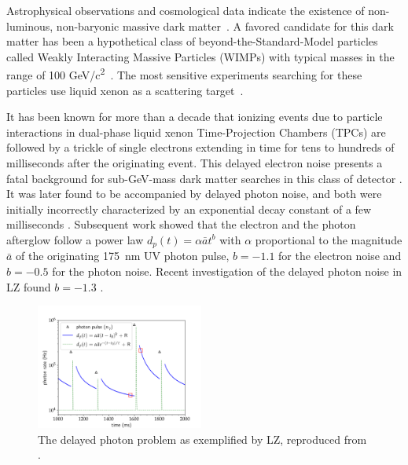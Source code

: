\documentclass[%
 reprint,
superscriptaddress,
nofootinbib,
 amsmath,amssymb,
 aps,
prl,
]{revtex4-2}
\begin{document}

Astrophysical observations and cosmological data indicate the existence of non-luminous, non-baryonic massive dark matter~\cite{Planck:2018vyg,Sofue:2000jx}. 
A favored candidate for this dark matter has been a hypothetical class of beyond-the-Standard-Model particles called Weakly Interacting Massive Particles (WIMPs) with typical masses in the range of 100 GeV/c\textsuperscript{2}~\cite{Schumann:2019eaa}. The most sensitive experiments searching for these particles use liquid xenon as a scattering target~\cite{LZ:2024zvo,XENON:2025vwd,PandaX-4T:2021bab}.

It has been known for more than a decade that ionizing events due to particle interactions in dual-phase liquid xenon Time-Projection Chambers (TPCs) are followed by a trickle of single electrons \cite{XENON10:2011prx} extending in time for tens to hundreds of milliseconds after the originating event. This delayed electron noise presents a fatal background for sub-GeV-mass dark matter searches in this class of detector \cite{Essig:2012yx}. It was later found to be accompanied by delayed photon noise, and both were initially incorrectly characterized by an exponential decay constant of a few milliseconds \cite{Sorensen:2017kpl}. Subsequent work \cite{LUX:2020vbj} showed that the electron and the photon afterglow follow a power law $d_p(t) = \alpha\bar{a}t^b$ with $\alpha$ proportional to the magnitude $\bar{a}$ of the originating 175~nm UV photon pulse, $b=-1.1$ for the electron noise and $b=-0.5$ for the photon noise. Recent investigation of the delayed photon noise in LZ found $b=-1.3$ \cite{Anderson-thesis}. 

\begin{figure}[hb]
    \centering
    \includegraphics[width=0.49\textwidth]{figs.000.png}
    \caption{The delayed photon problem as exemplified by LZ, reproduced from \cite{Anderson-thesis}.}
   \label{fig:photon-rate}
\end{figure}
\end{document}
